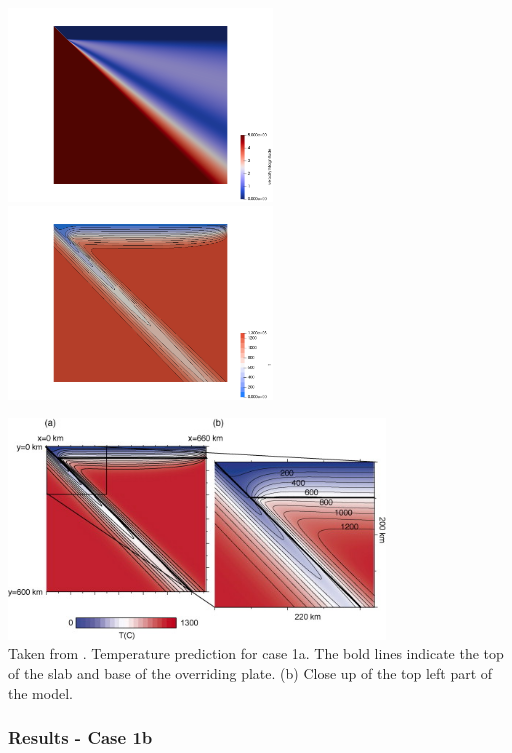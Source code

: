 \begin{center}
\includegraphics[width=7cm]{python_codes/fieldstone_68/results/case1a/vel_1a}
\includegraphics[width=7cm]{python_codes/fieldstone_68/results/case1a/T_1a}
\end{center}

\begin{center}
\includegraphics[width=10cm]{python_codes/fieldstone_68/images/fig2}\\
{\captionfont Taken from \cite{vack08}. Temperature prediction for case 1a. 
The bold lines indicate the top of the slab and base of the overriding plate. 
(b) Close up of the top left part of the model.}
\end{center}


\newpage
\subsubsection*{Results - Case 1b}

